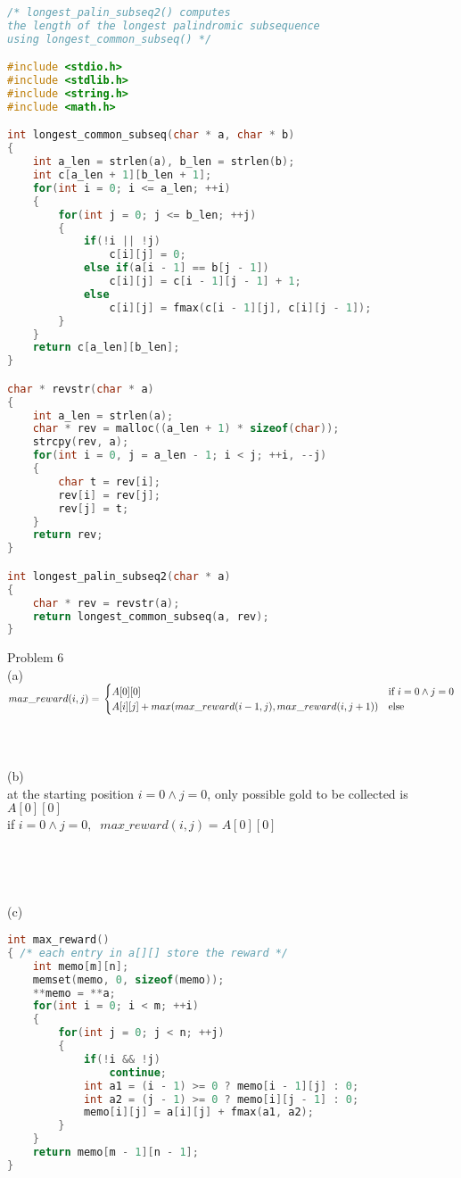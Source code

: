 \documentclass[12pt,border=4pt,multi]{article}%
\begin{document}
\begin{lstlisting}[language = c]
/* longest_palin_subseq2() computes 
the length of the longest palindromic subsequence
using longest_common_subseq() */

#include <stdio.h>
#include <stdlib.h>
#include <string.h>
#include <math.h>

int longest_common_subseq(char * a, char * b)
{
    int a_len = strlen(a), b_len = strlen(b);
    int c[a_len + 1][b_len + 1];
    for(int i = 0; i <= a_len; ++i)
    {
        for(int j = 0; j <= b_len; ++j)
        {
            if(!i || !j)
                c[i][j] = 0;
            else if(a[i - 1] == b[j - 1])
                c[i][j] = c[i - 1][j - 1] + 1;
            else
                c[i][j] = fmax(c[i - 1][j], c[i][j - 1]);
        }
    }
    return c[a_len][b_len];
}

char * revstr(char * a)
{
    int a_len = strlen(a);
    char * rev = malloc((a_len + 1) * sizeof(char));
    strcpy(rev, a);
    for(int i = 0, j = a_len - 1; i < j; ++i, --j)
    {
        char t = rev[i];
        rev[i] = rev[j];
        rev[j] = t;
    }
    return rev;
}

int longest_palin_subseq2(char * a)
{
    char * rev = revstr(a);
    return longest_common_subseq(a, rev);
}
\end{lstlisting}
\newpage
\noindent
Problem 6\\
(a)\\
$max\_reward(i, j) =\\
\begin{cases}
A[0][0] & \text{if } i = 0 \wedge j = 0\\
A[i][j] + max(max\_reward(i - 1, j), max\_reward(i, j + 1)) & \text{else}\\
\end{cases}$
\\
\\
\\
\\
(b)\\
at the starting position $i = 0 \wedge j = 0$, only possible gold to be collected is $A[0][0]$\\
if $i = 0 \wedge j = 0,\;\; max\_reward(i, j) = A[0][0]$\\ 
\\
\\
\\
\\
(c)
\begin{lstlisting}[language = c]
int max_reward()
{ /* each entry in a[][] store the reward */
    int memo[m][n];
    memset(memo, 0, sizeof(memo));
    **memo = **a;
    for(int i = 0; i < m; ++i)
    {
        for(int j = 0; j < n; ++j)
        {
            if(!i && !j)
                continue;
            int a1 = (i - 1) >= 0 ? memo[i - 1][j] : 0;
            int a2 = (j - 1) >= 0 ? memo[i][j - 1] : 0;
            memo[i][j] = a[i][j] + fmax(a1, a2);
        }
    }
    return memo[m - 1][n - 1];
}
\end{lstlisting}
\end{document}
